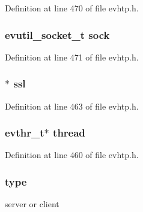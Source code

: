 Definition at line 470 of file evhtp.\-h.

\hypertarget{structevhtp__connection__s_a7544570bf388a535223a1e8e1b2301ac}{
\subsubsection[{sock}]{\setlength{\rightskip}{0pt plus 5cm}evutil\-\_\-socket\-\_\-t sock}}\label{structevhtp__connection__s_a7544570bf388a535223a1e8e1b2301ac}


Definition at line 471 of file evhtp.\-h.

\hypertarget{structevhtp__connection__s_a9d5e6d2a2098e174347708a6d561b2ec}{
\subsubsection[{ssl}]{$\ast$ ssl}}\label{structevhtp__connection__s_a9d5e6d2a2098e174347708a6d561b2ec}


Definition at line 463 of file evhtp.\-h.

\hypertarget{structevhtp__connection__s_aaf924ac18ad3dd26c8676d835116579e}{
\subsubsection[{thread}]{\setlength{\rightskip}{0pt plus 5cm}evthr\-\_\-t$\ast$ thread}}\label{structevhtp__connection__s_aaf924ac18ad3dd26c8676d835116579e}


Definition at line 460 of file evhtp.\-h.

\hypertarget{structevhtp__connection__s_a6188c3148fbaafe2848b330c9f8f4732}{
\subsubsection[{type}]{ type}}\label{structevhtp__connection__s_a6188c3148fbaafe2848b330c9f8f4732}
server or client 

